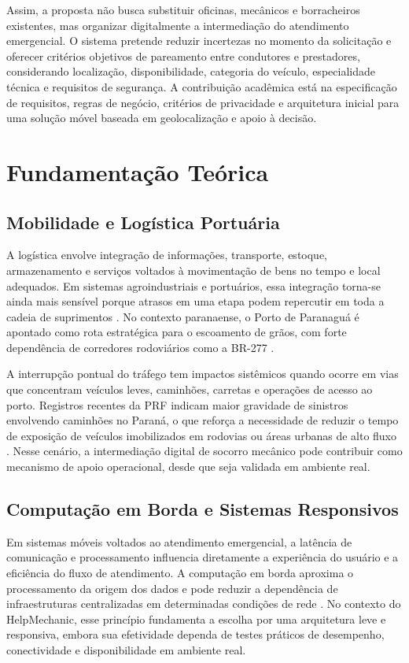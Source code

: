 \documentclass[12pt, a4paper]{article}
\begin{document}
Assim, a proposta não busca substituir oficinas, mecânicos e borracheiros existentes, mas organizar digitalmente a intermediação do atendimento emergencial. O sistema pretende reduzir incertezas no momento da solicitação e oferecer critérios objetivos de pareamento entre condutores e prestadores, considerando localização, disponibilidade, categoria do veículo, especialidade técnica e requisitos de segurança. A contribuição acadêmica está na especificação de requisitos, regras de negócio, critérios de privacidade e arquitetura inicial para uma solução móvel baseada em geolocalização e apoio à decisão.

\section{Fundamentação Teórica}

\subsection{Mobilidade e Logística Portuária}
A logística envolve integração de informações, transporte, estoque, armazenamento e serviços voltados à movimentação de bens no tempo e local adequados. Em sistemas agroindustriais e portuários, essa integração torna-se ainda mais sensível porque atrasos em uma etapa podem repercutir em toda a cadeia de suprimentos \cite{caixeta_gameiro2001}. No contexto paranaense, o Porto de Paranaguá é apontado como rota estratégica para o escoamento de grãos, com forte dependência de corredores rodoviários como a BR-277 \cite{aguilar2018}.

A interrupção pontual do tráfego tem impactos sistêmicos quando ocorre em vias que concentram veículos leves, caminhões, carretas e operações de acesso ao porto. Registros recentes da PRF indicam maior gravidade de sinistros envolvendo caminhões no Paraná, o que reforça a necessidade de reduzir o tempo de exposição de veículos imobilizados em rodovias ou áreas urbanas de alto fluxo \cite{prf2025}. Nesse cenário, a intermediação digital de socorro mecânico pode contribuir como mecanismo de apoio operacional, desde que seja validada em ambiente real.

\subsection{Computação em Borda e Sistemas Responsivos}
Em sistemas móveis voltados ao atendimento emergencial, a latência de comunicação e processamento influencia diretamente a experiência do usuário e a eficiência do fluxo de atendimento. A computação em borda aproxima o processamento da origem dos dados e pode reduzir a dependência de infraestruturas centralizadas em determinadas condições de rede \cite{satyanarayanan2017, fama2018}. No contexto do HelpMechanic, esse princípio fundamenta a escolha por uma arquitetura leve e responsiva, embora sua efetividade dependa de testes práticos de desempenho, conectividade e disponibilidade em ambiente real.
\end{document}
